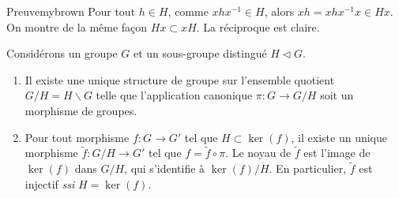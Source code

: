     \begin{demo}{Preuve}{mybrown}
        Pour tout $h \in H$, comme $x h x^{-1} \in H$, alors $x h = x h x^{-1} x \in Hx$. On montre de la même façon $Hx \subset xH$. La réciproque est claire.
    \end{demo}

    \begin{theo}{}{}
        Considérons un groupe $G$ et un sous-groupe distingué $H \lhd G$.
        \begin{enumerate}
            \item Il existe une unique structure de groupe sur l’ensemble quotient $G / H = H \backslash G$ telle que l’application canonique $\pi : G \to G / H$ soit un morphisme de groupes.
            \item Pour tout morphisme $f : G \to G'$ tel que $H \subset \ker(f)$, il existe un unique morphisme $\tilde{f} : G / H \to G'$ tel que $f = \tilde{f} \circ \pi$. Le noyau de $\tilde{f}$ est l’image de $\ker(f)$ dans $G / H$, qui s’identifie à $\ker(f) / H$. En particulier, $\tilde{f}$ est injectif \textit{ssi} $H = \ker(f)$.
        \end{enumerate}
    \end{theo}

